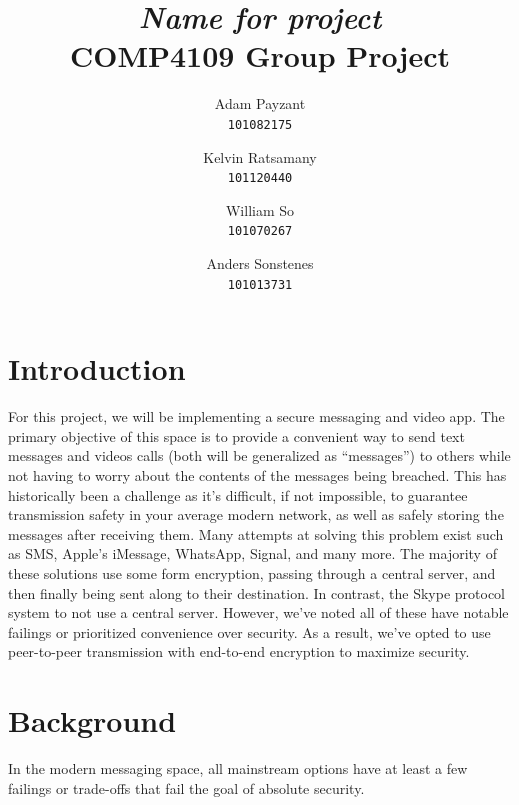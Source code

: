 \documentclass[titlepage]{article}
\title{\textit{Name for project} \\
    \large COMP4109 Group Project
}
\author{Adam Payzant \\
    \texttt{101082175} \\
    \and
    Kelvin Ratsamany \\
    \texttt{101120440}
    \and
    William So \\
    \texttt{101070267} \\
    \and
    Anders Sonstenes \\
    \texttt{101013731}
}
\begin{document}
    \maketitle

    \section{Introduction}

      For this project, we will be implementing a secure messaging and video app.
      The primary objective of this space is to provide a convenient way to send text messages and videos calls (both will be generalized as ``messages'') to others while not having to worry about the contents of the messages being breached.
      This has historically been a challenge as it's difficult, if not impossible, to guarantee transmission safety in your average modern network, as well as safely storing the messages after receiving them.
      Many attempts at solving this problem exist such as SMS, Apple's iMessage, WhatsApp, Signal, and many more.
      The majority of these solutions use some form encryption, passing through a central server, and then finally being sent along to their destination.
      In contrast, the Skype protocol system to not use a central server.
      However, we've noted all of these have notable failings or prioritized convenience over security.
      As a result, we've opted to use peer-to-peer transmission with end-to-end encryption to maximize security.

    \section{Background}

      In the modern messaging space, all mainstream options have at least a few failings or trade-offs that fail the goal of absolute security.
\end{document}

